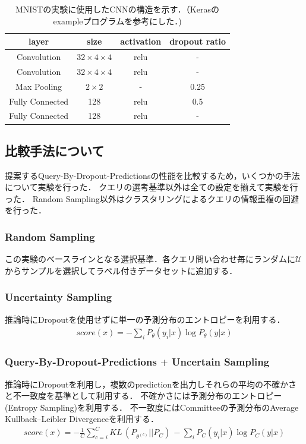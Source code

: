 \begin{table}[h]
    
    \caption{\label{table:mnist_cnn}MNISTの実験に使用したCNNの構造を示す．（Kerasのexampleプログラムを参考にした．)}
    \center
    \begin{tabular}{|c|c|c|c|} \hline
        layer & size & activation & dropout ratio\\ \hline
        Convolution & $32 \times 4 \times 4$ & relu & - \\
        Convolution & $32 \times 4 \times 4$ & relu & - \\
        Max Pooling & $2 \times 2$ & - & 0.25  \\ 
        Fully Connected & 128 & relu & 0.5 \\
        Fully Connected & 128 & relu & - \\
        \hline
    \end{tabular}
\end{table}

\subsection{比較手法について}
提案するQuery-By-Dropout-Predictionsの性能を比較するため，いくつかの手法について実験を行った．
クエリの選考基準以外は全ての設定を揃えて実験を行った．
Random Sampling以外はクラスタリングによるクエリの情報重複の回避を行った．

\subsubsection{Random Sampling}
この実験のベースラインとなる選択基準．各クエリ問い合わせ毎にランダムに$\mathcal{U}$からサンプルを選択してラベル付きデータセットに追加する．

\subsubsection{Uncertainty Sampling}
推論時にDropoutを使用せずに単一の予測分布のエントロピーを利用する．
\begin{eqnarray}
    score(x) =  - \sum_i {P_{\theta}(y_i|x)} \log P_{\theta}(y|x)
\end{eqnarray}

\subsubsection{Query-By-Dropout-Predictions $+$ Uncertain Sampling}
推論時にDropoutを利用し，複数のpredictionを出力しそれらの平均の不確かさと不一致度を基準として利用する．
不確かさには予測分布のエントロピー(Entropy Sampling)を利用する．
不一致度にはCommitteeの予測分布のAverage Kullback–Leibler Divergenceを利用する．
\begin{eqnarray}
    score(x) =  -  \frac{1}{C} \sum_{c=i}^C KL \, (P_{\theta^{(c)}} || P_C) \, - \sum_i {P_C(y_i|x)} \log P_C(y|x)
\end{eqnarray}

